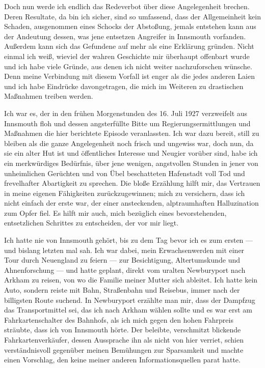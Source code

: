 Doch nun werde ich endlich das Redeverbot über diese Angelegenheit brechen. Deren Resultate, da bin ich sicher, sind so umfassend, dass der Allgemeinheit kein Schaden, ausgenommen eines Schocks der Abstoßung, jemals entstehen kann aus der Andeutung dessen, was jene entsetzen Angreifer in Innsmouth vorfanden. Außerdem kann sich das Gefundene auf mehr als eine Erklärung gründen. Nicht einmal ich weiß, wieviel der wahren Geschichte mir überhaupt offenbart wurde und ich habe viele Gründe, aus denen ich nicht weiter nachzuforschen wünsche. Denn meine Verbindung mit diesem Vorfall ist enger als die jedes anderen Laien und ich habe Eindrücke davongetragen, die mich im Weiteren zu drastischen Maßnahmen treiben werden.

Ich war es, der in den frühen Morgenstunden des 16. Juli 1927 verzweifelt aus Innsmouth floh und dessen angsterfüllte Bitte um Regierungsermittlungen und Maßnahmen die hier berichtete Episode veranlassten. Ich war dazu bereit, still zu bleiben als die ganze Angelegenheit noch frisch und ungewiss war, doch nun, da sie ein alter Hut ist und öffentliches Interesse und Neugier vorüber sind, habe ich ein merkwürdiges Bedürfnis, über jene wenigen, angstvollen Stunden in jener von unheimlichen Gerüchten und von Übel beschatteten Hafenstadt voll Tod und frevelhafter Abartigkeit zu sprechen. Die bloße Erzählung hilft mir, das Vertrauen in meine eigenen Fähigkeiten zurückzugewinnen; mich zu versichern, dass ich nicht einfach der erste war, der einer ansteckenden, alptraumhaften Halluzination zum Opfer fiel. Es hilft mir auch, mich bezüglich eines bevorstehenden, entsetzlichen Schrittes zu entscheiden, der vor mir liegt.

Ich hatte nie von Innsmouth gehört, bis zu dem Tag bevor ich es zum ersten --- und bislang letzten mal sah. Ich war dabei, mein Erwachsenwerden mit einer Tour durch Neuengland zu feiern --- zur Besichtigung, Altertumskunde und Ahnenforschung --- und hatte geplant, direkt vom uralten Newburyport nach Arkham zu reisen, von wo die Familie meiner Mutter sich ableitet. Ich hatte kein Auto, sondern reiste mit Bahn, Straßenbahn und Reisebus, immer nach der billigsten Route suchend. In Newburyport erzählte man mir, dass der Dampfzug das Transportmittel sei, das ich nach Arkham wählen sollte und es war erst  am Fahrkartenschalter des Bahnhofs, als ich mich gegen den hohen Fahrpreis sträubte, dass ich von Innsmouth hörte. Der beleibte, verschmitzt blickende Fahrkartenverkäufer, dessen Aussprache ihn als nicht von hier verriet, schien verständnisvoll gegenüber meinen Bemühungen zur Sparsamkeit und machte einen Vorschlag, den keine meiner anderen Informationsquellen parat hatte.

